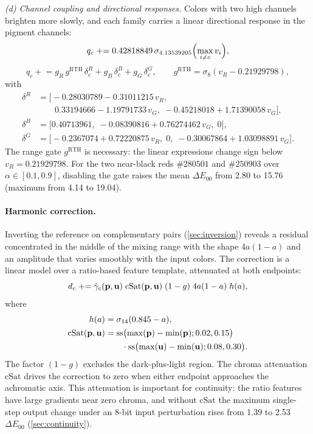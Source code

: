 \emph{(d) Channel coupling and directional responses.} Colors with two high channels brighten more slowly, and each family carries a linear directional response in the pigment channels:
\begin{equation}
q_{c}\mathrel{+}=0.42818849\,\sigma_{4.13539205}\Bigl(\max_{i\ne c}v_{i}\Bigr),
\label{eq:coupling}
\end{equation}
\begin{equation}
q_{c}\mathrel{+}=g_{R}\,g^{\mathrm{RTH}}\,\delta^{R}_{c}+g_{B}\,\delta^{B}_{c}+g_{G}\,\delta^{G}_{c},
\qquad
g^{\mathrm{RTH}}=\sigma_{8}(v_{R}-0.21929798),
\label{eq:directional}
\end{equation}
with
\begin{align}
\delta^{R}&=\bigl[-0.28030789-0.31011215\,v_{R},\nonumber\\
&\qquad 0.33194666-1.19791733\,v_{G},\; -0.45218018+1.71390058\,v_{G}\bigr],\nonumber\\
\delta^{B}&=\bigl[0.40713961,\; -0.08390816+0.76274462\,v_{G},\; 0\bigr],\label{eq:deltas}\\
\delta^{G}&=\bigl[-0.2367074+0.72220875\,v_{R},\; 0,\; -0.30067864+1.03098891\,v_{G}\bigr].\nonumber
\end{align}
The range gate $g^{\mathrm{RTH}}$ is necessary: the linear expressions change sign below $v_{R}=0.21929798$. For the two near-black reds $\#280501$ and $\#250903$ over $\alpha\in[0.1,0.9]$, disabling the gate raises the mean $\Delta E_{00}$ from 2.80 to 15.76 (maximum from 4.14 to 19.04).

\paragraph{Harmonic correction.}
Inverting the reference on complementary pairs (\cref{sec:inversion}) reveals a residual concentrated in the middle of the mixing range with the shape $4a(1-a)$ and an amplitude that varies smoothly with the input colors. The correction is a linear model over a ratio-based feature template, attenuated at both endpoints:
\begin{equation}
d_{c}\mathrel{+}=\hat{\gamma}_{c}(\mathbf{p},\mathbf{u})\;\mathrm{cSat}(\mathbf{p},\mathbf{u})\;(1-g)\;4a(1-a)\;h(a),
\label{eq:harmonic}
\end{equation}
where
\begin{equation}
\begin{aligned}
h(a)&=\sigma_{14}(0.845-a),\\
\mathrm{cSat}(\mathbf{p},\mathbf{u})&=\operatorname{ss}\bigl(\max(\mathbf{p})-\min(\mathbf{p});0.02,0.15\bigr)\\
&\qquad\cdot\operatorname{ss}\bigl(\max(\mathbf{u})-\min(\mathbf{u});0.08,0.30\bigr).
\end{aligned}
\label{eq:csat}
\end{equation}
The factor $(1-g)$ excludes the dark-plus-light region. The chroma attenuation $\mathrm{cSat}$ drives the correction to zero when either endpoint approaches the achromatic axis. This attenuation is important for continuity: the ratio features have large gradients near zero chroma, and without $\mathrm{cSat}$ the maximum single-step output change under an 8-bit input perturbation rises from 1.39 to 2.53 $\Delta E_{00}$ (\cref{sec:continuity}).

